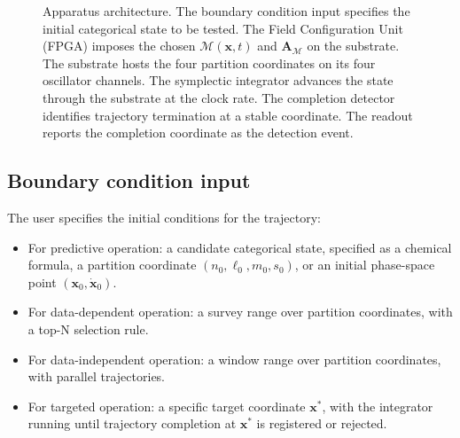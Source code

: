 \documentclass[twocolumn,11pt,a4paper]{article}
\theoremstyle{definition}
\theoremstyle{remark}
\newcommand{\Depth}{\mathcal{M}}
\newcommand{\Apartition}{\mathbf{A}_{\mathcal{M}}}
\begin{document}
\begin{figure}[H]
\centering
{}
\caption{Apparatus architecture. The boundary condition input specifies the initial categorical state to be tested. The Field Configuration Unit (FPGA) imposes the chosen $\Depth(\mathbf{x},t)$ and $\Apartition$ on the substrate. The substrate hosts the four partition coordinates on its four oscillator channels. The symplectic integrator advances the state through the substrate at the clock rate. The completion detector identifies trajectory termination at a stable coordinate. The readout reports the completion coordinate as the detection event.}
\label{fig:architecture}
\end{figure}

\subsection{Boundary condition input}

The user specifies the initial conditions for the trajectory:

\begin{itemize}[nosep]
    \item For predictive operation: a candidate categorical state, specified as a chemical formula, a partition coordinate $(n_0, \ell_0, m_0, s_0)$, or an initial phase-space point $(\mathbf{x}_0, \dot{\mathbf{x}}_0)$.
    \item For data-dependent operation: a survey range over partition coordinates, with a top-N selection rule.
    \item For data-independent operation: a window range over partition coordinates, with parallel trajectories.
    \item For targeted operation: a specific target coordinate $\mathbf{x}^\ast$, with the integrator running until trajectory completion at $\mathbf{x}^\ast$ is registered or rejected.
\end{itemize}
\end{document}
